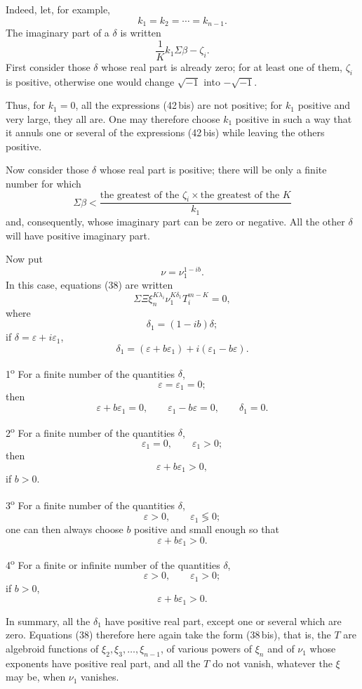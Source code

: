 \documentclass[11pt]{article}
\begin{document}
Indeed, let, for example,
\[
k_1=k_2=\cdots=k_{n-1}.
\]
The imaginary part of a $\delta$ is written
\begin{equation*}\tag{42\,bis}
\frac1K k_1\Sigma\beta-\zeta_i.
\end{equation*}
First consider those $\delta$ whose real part is already zero; for at least one of them, $\zeta_i$ is positive, otherwise one would change $\sqrt{-1}$ into $-\sqrt{-1}$.

Thus, for $k_1=0$, all the expressions (42\,bis) are not positive; for $k_1$ positive and very large, they all are. One may therefore choose $k_1$ positive in such a way that it annuls one or several of the expressions (42\,bis) while leaving the others positive.

Now consider those $\delta$ whose real part is positive; there will be only a finite number for which
\[
\Sigma\beta<\frac{\text{the greatest of the }\zeta_i\times \text{the greatest of the }K}{k_1}
\]
and, consequently, whose imaginary part can be zero or negative. All the other $\delta$ will have positive imaginary part.

Now put
\[
\nu=\nu_1^{1-ib}.
\]
In this case, equations (38) are written
\[
\Sigma\Xi\xi_n^{K\lambda_i}\nu_1^{K\delta_1}T_i^{m-K}=0,
\]
where
\[
\delta_1=(1-ib)\delta;
\]
if $\delta=\varepsilon+i\varepsilon_1$,
\[
\delta_1=(\varepsilon+b\varepsilon_1)+i(\varepsilon_1-b\varepsilon).
\]

1\textsuperscript{o} For a finite number of the quantities $\delta$,
\[
\varepsilon=\varepsilon_1=0;
\]
then
\[
\varepsilon+b\varepsilon_1=0,
\qquad
\varepsilon_1-b\varepsilon=0,
\qquad
\delta_1=0.
\]

2\textsuperscript{o} For a finite number of the quantities $\delta$,
\[
\varepsilon_1=0,
\qquad
\varepsilon_1>0;
\]
then
\[
\varepsilon+b\varepsilon_1>0,
\]
if $b>0$.

3\textsuperscript{o} For a finite number of the quantities $\delta$,
\[
\varepsilon>0,
\qquad
\varepsilon_1\lessgtr 0;
\]
one can then always choose $b$ positive and small enough so that
\[
\varepsilon+b\varepsilon_1>0.
\]

4\textsuperscript{o} For a finite or infinite number of the quantities $\delta$,
\[
\varepsilon>0,
\qquad
\varepsilon_1>0;
\]
if $b>0$,
\[
\varepsilon+b\varepsilon_1>0.
\]

In summary, all the $\delta_1$ have positive real part, except one or several which are zero. Equations (38) therefore here again take the form (38\,bis), that is, the $T$ are algebroid functions of $\xi_2,\xi_3,\ldots,\xi_{n-1}$, of various powers of $\xi_n$ and of $\nu_1$ whose exponents have positive real part, and all the $T$ do not vanish, whatever the $\xi$ may be, when $\nu_1$ vanishes.
\end{document}
